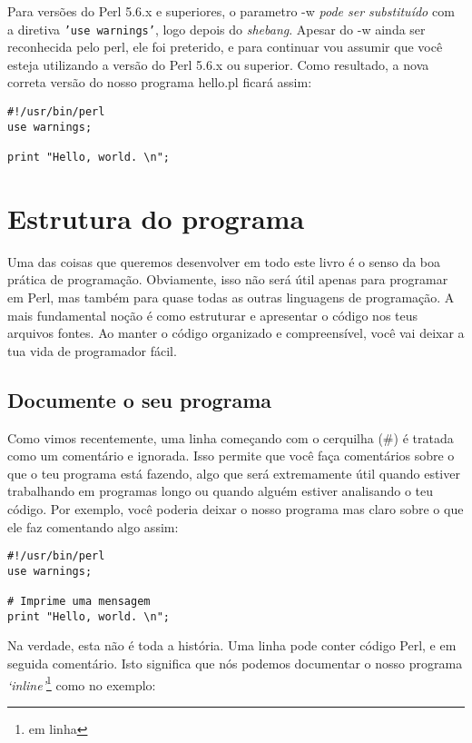 \documentclass[a4paper,12pt,twoside]{book}
\begin{document}
\noindent Para versões do Perl 5.6.x e superiores, o parametro -w \textit{pode ser substituído}
com a diretiva \texttt{'use warnings'}, logo depois do \textit{shebang}. 
Apesar do -w ainda ser reconhecida pelo perl, ele foi preterido, 
e para continuar vou assumir que você esteja utilizando a versão do Perl 5.6.x ou superior.
Como resultado, a nova correta versão do nosso programa hello.pl ficará assim:\medskip

\begin{lstlisting}
#!/usr/bin/perl
use warnings;

print "Hello, world. \n";
\end{lstlisting}

\section{Estrutura do programa}

\noindent Uma das coisas que queremos desenvolver em todo este livro é o 
senso da boa prática de programação. Obviamente, isso não será útil apenas 
para programar em Perl, mas também para quase todas as outras linguagens 
de programação. A mais fundamental noção é como estruturar e apresentar 
o código nos teus arquivos fontes. Ao manter o código organizado e 
compreensível, você vai deixar a tua vida de programador fácil.\medskip

\subsection{Documente o seu programa}

\noindent Como vimos recentemente, uma linha começando com o cerquilha (\#) é 
tratada como um comentário e ignorada. Isso permite que você faça comentários 
sobre o que o teu programa está fazendo, algo que será extremamente útil quando 
estiver trabalhando em programas longo ou quando alguém estiver analisando 
o teu código. Por exemplo, você poderia deixar o nosso programa mas claro 
sobre o que ele faz comentando algo assim:

\begin{lstlisting}
#!/usr/bin/perl
use warnings;

# Imprime uma mensagem
print "Hello, world. \n";
\end{lstlisting}

\noindent Na verdade, esta não é toda a história. Uma linha pode conter código 
Perl, e em seguida comentário. Isto significa que nós podemos documentar o nosso
programa \textit{`inline'}\footnote{em linha} como no exemplo:
\end{document}
